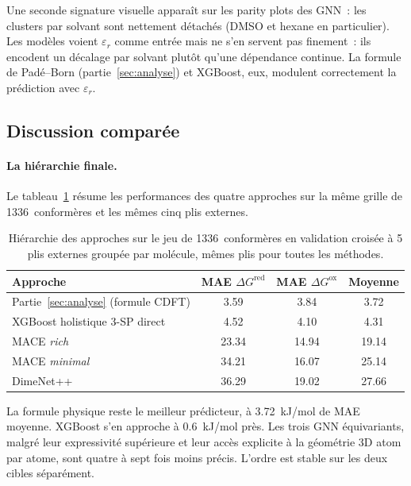 Une seconde signature visuelle apparaît sur les parity plots des GNN~: les clusters par solvant sont nettement détachés (DMSO et hexane en particulier). Les modèles voient $\varepsilon_r$ comme entrée mais ne s'en servent pas finement~: ils encodent un décalage par solvant plutôt qu'une dépendance continue. La formule de Padé--Born (partie~\ref{sec:analyse}) et XGBoost, eux, modulent correctement la prédiction avec $\varepsilon_r$.

\subsection{Discussion comparée}
\label{sec:ml_discussion}

\paragraph{La hiérarchie finale.}
Le tableau~\ref{tab:hierarchie_finale} résume les performances des quatre approches sur la même grille de 1336~conformères et les mêmes cinq plis externes.

\begin{table}[H]
\centering
\caption{Hiérarchie des approches sur le jeu de 1336~conformères en validation croisée à 5 plis externes groupée par molécule, mêmes plis pour toutes les méthodes.}
\label{tab:hierarchie_finale}
\footnotesize
\begin{tabular}{l c c c}
\toprule
\textbf{Approche} & \textbf{MAE $\Delta G^\text{red}$} & \textbf{MAE $\Delta G^\text{ox}$} & \textbf{Moyenne} \\
\midrule
Partie~\ref{sec:analyse} (formule CDFT)     & 3.59  & 3.84  & 3.72 \\
XGBoost holistique 3-SP direct              & 4.52  & 4.10  & 4.31 \\
MACE \emph{rich}                            & 23.34 & 14.94 & 19.14 \\
MACE \emph{minimal}                         & 34.21 & 16.07 & 25.14 \\
DimeNet++                                   & 36.29 & 19.02 & 27.66 \\
\bottomrule
\end{tabular}
\end{table}

La formule physique reste le meilleur prédicteur, à \SI{3.72}{kJ/mol} de MAE moyenne. XGBoost s'en approche à \SI{0.6}{kJ/mol} près. Les trois GNN équivariants, malgré leur expressivité supérieure et leur accès explicite à la géométrie 3D atom par atome, sont quatre à sept fois moins précis. L'ordre est stable sur les deux cibles séparément.

